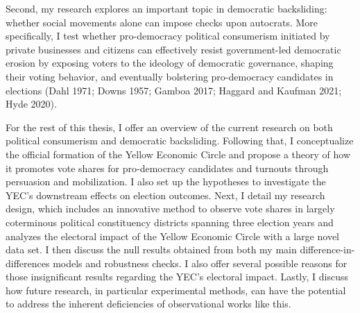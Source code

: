 \documentclass[letterpaper, 12pt]{article}
\begin{document}
Second, my research explores an important topic in democratic backsliding: whether social movements alone can impose checks upon autocrats. More specifically, I test whether pro-democracy political consumerism initiated by private businesses and citizens can effectively resist government-led democratic erosion by exposing voters to the ideology of democratic governance, shaping their voting behavior, and eventually bolstering pro-democracy candidates in elections (Dahl 1971; Downs 1957; Gamboa 2017; Haggard and Kaufman 2021; Hyde 2020).


For the rest of this thesis, I offer an overview of the current research on both political consumerism and democratic backsliding. Following that, I conceptualize the official formation of the Yellow Economic Circle and propose a theory of how it promotes vote shares for pro-democracy candidates and turnouts through persuasion and mobilization. I also set up the hypotheses to investigate the YEC's downstream effects on election outcomes. Next, I detail my research design, which includes an innovative method to observe vote shares in largely coterminous political constituency districts spanning three election years and analyzes the electoral impact of the Yellow Economic Circle with a large novel data set. I then discuss the null results obtained from both my main difference-in-differences models and robustness checks. I also offer several possible reasons for those insignificant results regarding the YEC's electoral impact. Lastly, I discuss how future research, in particular experimental methods, can have the potential to address the inherent deficiencies of observational works like this.
\end{document}
